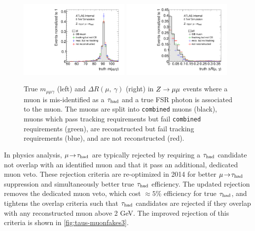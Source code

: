 \begin{figure}[tp]
  \centering
  \includegraphics[width=0.48\textwidth]{figures/tauperformance/muonfakes_mlly}
  \includegraphics[width=0.48\textwidth]{figures/tauperformance/muonfakes_dR}
  \caption{True $m_{\mu\mu\gamma}$ (left) and $\Delta R(\mu,\ \gamma)$ (right) in $Z \rightarrow \mu\mu$ events where a muon is mis-identified as a $\tau_\text{had}$ and a true FSR photon is associated to the muon. The muons are split into \texttt{combined} muons (black), muons which pass tracking requirements but fail \texttt{combined} requirements (green), are reconstructed but fail tracking requirements (blue), and are not reconstructed (red).}
  \label{fig:taus-muonfakes2}
\end{figure}

In physics analysis, $\mu\!\rightarrow\!\tau_\text{had}$ are typically rejected by requiring a $\tau_\text{had}$ candidate not overlap with an identified muon and that it pass an additional, dedicated muon veto. These rejection criteria are re-optimized in 2014 for better $\mu\!\rightarrow\!\tau_\text{had}$ suppression and simultaneously better true $\tau_\text{had}$ efficiency. The updated rejection removes the dedicated muon veto, which cost $\approx\!5\%$ efficiency for true $\tau_\text{had}$, and tightens the overlap criteria such that $\tau_\text{had}$ candidates are rejected if they overlap with any reconstructed muon above 2 GeV. The improved rejection of this criteria is shown in \cref{fig:taus-muonfakes3}.

